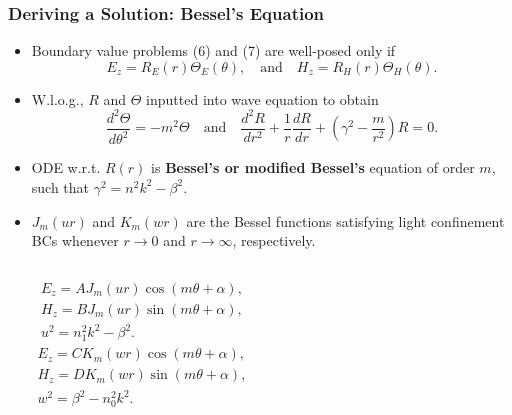 \documentclass{beamer}
\begin{document}
\begin{frame}
\frametitle{\textbf{Deriving a Solution:} Bessel's Equation}
\begin{itemize}
\item Boundary value problems (6) and (7) are well-posed only if $$E_z=R_E(r)\Theta_E(\theta),\quad\mbox{and}\quad H_z=R_H(r)\Theta_H(\theta).$$
\item W.l.o.g., $R$ and $\Theta$ inputted into wave equation to obtain
\begin{equation}
\frac{d^2\Theta}{d\theta^2}=-m^2\Theta\quad\mbox{and}\quad\frac{d^2 R}{dr^2}+\frac{1}{r}\frac{dR}{dr}+\left(\gamma^2-\frac{m}{r^2}\right)R=0.\nonumber
\end{equation}
\item ODE w.r.t. $R(r)$ is \textbf{Bessel's or modified Bessel's} equation of order $m$, such that $\gamma^2=n^2k^2-\beta^2$.
\item $J_m(ur)$ and $K_m(wr)$ are the Bessel functions satisfying light confinement BCs whenever $r\rightarrow 0$ and $r\rightarrow\infty$, respectively.
\begin{columns}
\begin{equation}
\begin{array}{c}
E_z=AJ_m(ur)\cos{(m\theta+\alpha)},\\
H_z=BJ_m(ur)\sin{(m\theta+\alpha)},\\
u^2=n_1^2k^2-\beta^2.
\end{array}\nonumber
\end{equation}
\begin{equation}
\begin{array}{c}
E_z=CK_m(wr)\cos{(m\theta+\alpha)},\\
H_z=DK_m(wr)\sin{(m\theta+\alpha)},\\
w^2=\beta^2-n_0^2k^2.
\end{array}\nonumber
\end{equation}
\end{columns}
\end{itemize}
\end{frame}
\end{document}
